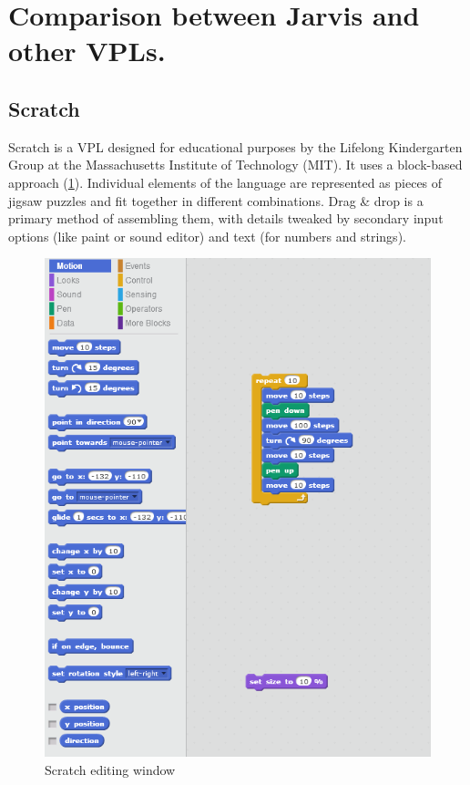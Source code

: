 \documentclass[11pt]{scrartcl}
\begin{document}
\section{Comparison between Jarvis and other VPLs.}
\subsection{Scratch}
Scratch is a VPL designed for educational purposes by the Lifelong Kindergarten
Group at the Massachusetts Institute of Technology (MIT).
It uses a block-based approach (\ref{scratch}).
Individual elements of the language are represented as pieces of jigsaw puzzles
and fit together in different combinations.
Drag \& drop is a primary method of assembling them, with details tweaked by
secondary input options (like paint or sound editor) and text (for numbers and
strings).

\begin{figure}[hbt]
  \includegraphics[scale=0.3]{img/s-puzzle}
  \caption{Scratch editing window}
  \label{scratch}
\end{figure}
\end{document}
